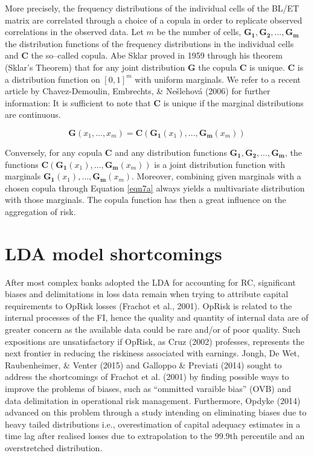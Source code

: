 \documentclass{DissertateUSU}
\begin{document}
More precisely, the frequency distributions of the individual cells of
the BL/ET matrix are correlated through a choice of a copula in order to
replicate observed correlations in the observed data. Let \(m\) be the
number of cells, \(\mathbf{G_1}, \mathbf{G_2},...,\mathbf{G_m}\) the
distribution functions of the frequency distributions in the individual
cells and \(\mathbf{C}\) the so--called copula. Abe Sklar proved in 1959
through his theorem (Sklar's Theorem) that for any joint distribution
\(\mathbf{G}\) the copula \(\mathbf{C}\) is unique. \(\mathbf{C}\) is a
distribution function on \([0,1]^{m}\) with uniform marginals. We refer
to a recent article by Chavez-Demoulin, Embrechts, \& Nešlehová (2006)
for further information: It is sufficient to note that \(\mathbf{C}\) is
unique if the marginal distributions are continuous.

\singlespacing

\begin{equation}\label{eqn7a}
\mathbf{G}(x_1, \ldots, x_m) = \mathbf{C}\left(\mathbf{G_1}(x_1), \ldots, \mathbf{G_m}(x_m) \right)
\end{equation} \doublespacing

Conversely, for any copula \(\mathbf{C}\) and any distribution functions
\(\mathbf{G_1}, \mathbf{G_2},...,\mathbf{G_m}\), the functions
\(\mathbf{C}\left(\mathbf{G_1}(x_1), \ldots, \mathbf{G_m}(x_m) \right)\)
is a joint distribution function with marginals
\(\mathbf{G_1}(x_1), \ldots, \mathbf{G_m}(x_m)\). Moreover, combining
given marginals with a chosen copula through Equation \ref{eqn7a} always
yields a multivariate distribution with those marginals. The copula
function has then a great influence on the aggregation of risk.

\section{LDA model shortcomings}
\label{ssec:LDA model shortcomings}

After most complex banks adopted the LDA for accounting for RC,
significant biases and delimitations in loss data remain when trying to
attribute capital requirements to OpRisk losses (Frachot et al., 2001).
OpRisk is related to the internal processes of the FI, hence the quality
and quantity of internal data are of greater concern as the available
data could be rare and/or of poor quality. Such expositions are
unsatisfactory if OpRisk, as Cruz (2002) professes, represents the next
frontier in reducing the riskiness associated with earnings. Jongh, De
Wet, Raubenheimer, \& Venter (2015) and Galloppo \& Previati (2014)
sought to address the shortcomings of Frachot et al. (2001) by finding
possible ways to improve the problems of biases, such as ``ommitted
varaible bias'' (OVB) and data delimitation in operational risk
management. Furthermore, Opdyke (2014) advanced on this problem through
a study intending on eliminating biases due to heavy tailed
distributions i.e., overestimation of capital adequacy estimates in a
time lag after realised losses due to extrapolation to the 99.9th
percentile and an overstretched distribution.\medskip
\end{document}
